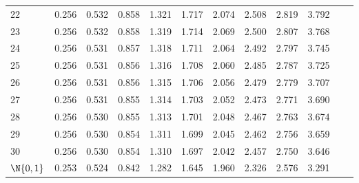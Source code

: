 \begin{table}[!htbp]
\begin{tabularx}{\linewidth}{@{}BYZYZYZYZYZY@{}}
            22            & 0.256        & 0.532        & 0.858        & 1.321        & 1.717         & 2.074          & 2.508         & 2.819          & 3.792           \\
            23            & 0.256        & 0.532        & 0.858        & 1.319        & 1.714         & 2.069          & 2.500         & 2.807          & 3.768           \\
            24            & 0.256        & 0.531        & 0.857        & 1.318        & 1.711         & 2.064          & 2.492         & 2.797          & 3.745           \\
            25            & 0.256        & 0.531        & 0.856        & 1.316        & 1.708         & 2.060          & 2.485         & 2.787          & 3.725           \\
            26            & 0.256        & 0.531        & 0.856        & 1.315        & 1.706         & 2.056          & 2.479         & 2.779          & 3.707           \\
            27            & 0.256        & 0.531        & 0.855        & 1.314        & 1.703         & 2.052          & 2.473         & 2.771          & 3.690           \\
            28            & 0.256        & 0.530        & 0.855        & 1.313        & 1.701         & 2.048          & 2.467         & 2.763          & 3.674           \\
            29            & 0.256        & 0.530        & 0.854        & 1.311        & 1.699         & 2.045          & 2.462         & 2.756          & 3.659           \\
            30            & 0.256        & 0.530        & 0.854        & 1.310        & 1.697         & 2.042          & 2.457         & 2.750          & 3.646           \\
            $ \N{0,1} $   & 0.253        & 0.524        & 0.842        & 1.282        & 1.645         & 1.960          & 2.326         & 2.576          & 3.291           \\
      \end{tabularx}
\end{table}
